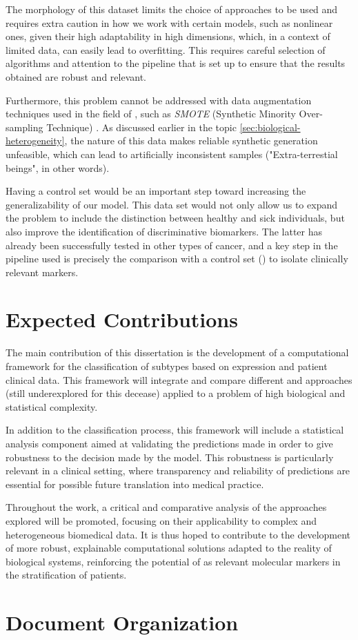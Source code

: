 The morphology of this dataset limits the choice of approaches to be used and
requires extra caution in how we work with certain models, such as nonlinear
ones, given their high adaptability in high dimensions, which, in a context of
limited data, can easily lead to overfitting. This requires careful selection
of algorithms and attention to the pipeline that is set up to ensure that the
results obtained are robust and relevant.

Furthermore, this problem cannot be addressed with data augmentation techniques
used in the field of , such as \textit{SMOTE} (Synthetic Minority
Over-sampling Technique) \textcite{SMOTE_Blagus2013SMOTE}. As discussed earlier
in the topic \ref{sec:biological-heterogeneity}, the nature of this data makes
reliable synthetic generation unfeasible, which can lead to artificially
inconsistent samples ("Extra-terrestial beings", in other words).

Having a control set would be an important step toward increasing the
generalizability of our model. This data set would not only allow us to expand
the problem to include the distinction between healthy and sick individuals,
but also improve the identification of discriminative biomarkers. The latter
has already been successfully tested in other types of cancer, and a key step
in the pipeline used is precisely the comparison with a control set
(\textcite{ml_gastric_Azari2023}) to isolate clinically relevant markers.

\section{Expected Contributions}
\label{sec:expected-contributions}
The main contribution of this dissertation is the development of a computational
framework for the classification of  subtypes based on 
expression and patient clinical data. This framework will integrate
and compare different  and  approaches (still underexplored for this decease)
applied to a problem of high biological and statistical complexity.

In addition to the classification process, this framework will include a
statistical analysis component aimed at validating the predictions made in
order to give robustness to the decision made by the model. This robustness is
particularly relevant in a clinical setting, where transparency and reliability
of predictions are essential for possible future translation into medical
practice.

Throughout the work, a critical and comparative analysis of the approaches
explored will be promoted, focusing on their applicability to complex and
heterogeneous biomedical data. It is thus hoped to contribute to the
development of more robust, explainable computational solutions adapted to the
reality of biological systems, reinforcing the potential of 
as relevant molecular markers in the stratification of  patients.

\section{Document Organization}
\label{sec:document-organization}
